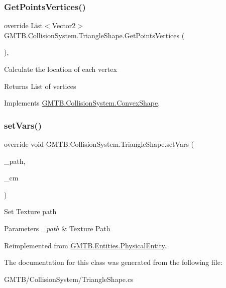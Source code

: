 \subsubsection{\texorpdfstring{GetPointsVertices()}{GetPointsVertices()}}
{\footnotesize\ttfamily override List$<$Vector2$>$ G\+M\+T\+B.\+Collision\+System.\+Triangle\+Shape.\+Get\+Points\+Vertices (\begin{DoxyParamCaption}{ }\end{DoxyParamCaption})\hspace{0.3cm}{\ttfamily [protected]}, {\ttfamily [virtual]}}



Calculate the location of each vertex 

\begin{DoxyReturn}{Returns}
List of vertices
\end{DoxyReturn}


Implements \mbox{\hyperlink{class_g_m_t_b_1_1_collision_system_1_1_convex_shape_a7748beb90c69edb0403c1c46ff99ac05}{G\+M\+T\+B.\+Collision\+System.\+Convex\+Shape}}.

\mbox{\label{class_g_m_t_b_1_1_collision_system_1_1_triangle_shape_a4389017110af14cca74a2a26475eccd6}} 
\subsubsection{\texorpdfstring{setVars()}{setVars()}}
{\footnotesize\ttfamily override void G\+M\+T\+B.\+Collision\+System.\+Triangle\+Shape.\+set\+Vars (\begin{DoxyParamCaption}\item[{string}]{\+\_\+path,  }\item[{\mbox{\hyperlink{interface_g_m_t_b_1_1_interfaces_1_1_i_content___manager}{I\+Content\+\_\+\+Manager}}}]{\+\_\+cm }\end{DoxyParamCaption})\hspace{0.3cm}{\ttfamily [virtual]}}



Set Texture path 


\begin{DoxyParams}{Parameters}
{\em \+\_\+path} & Texture Path\\
\hline
\end{DoxyParams}


Reimplemented from \mbox{\hyperlink{class_g_m_t_b_1_1_entities_1_1_physical_entity_add277bab26367c3364210b3577f6d7cd}{G\+M\+T\+B.\+Entities.\+Physical\+Entity}}.



The documentation for this class was generated from the following file\+:\begin{DoxyCompactItemize}
\item 
G\+M\+T\+B/\+Collision\+System/Triangle\+Shape.\+cs\end{DoxyCompactItemize}
